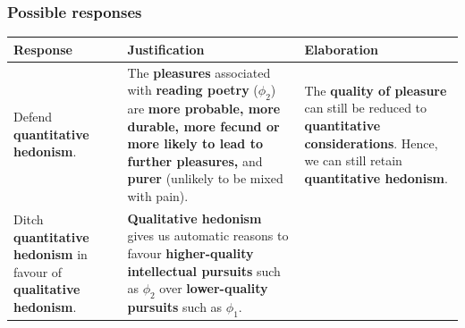 \documentclass[11pt]{article}
\begin{document}
\subsubsection{Possible responses}
\label{sec:orgf12ee24}
\begin{center}
\begin{tabular}{|m{10em}|m{15em}|m{10em}|}
\hline
Response & Justification & Elaboration\\
\hline
Defend \textbf{quantitative hedonism}. & The \textbf{pleasures} associated with \textbf{reading poetry} (\(\phi_2\)) are \textbf{more probable, more durable, more fecund or more likely to lead to further pleasures,} and \textbf{purer} (unlikely to be mixed with pain). & The \textbf{quality of pleasure} can still be reduced to \textbf{quantitative considerations}. Hence, we can still retain \textbf{quantitative hedonism}.\\
\hline
Ditch \textbf{quantitative hedonism} in favour of \textbf{qualitative hedonism}. & \textbf{Qualitative hedonism} gives us automatic reasons to favour \textbf{higher-quality intellectual pursuits} such as \(\phi_2\) over \textbf{lower-quality pursuits} such as \(\phi_1\). & \\
\hline
\end{tabular}
\end{center}
 \newpage
\end{document}
